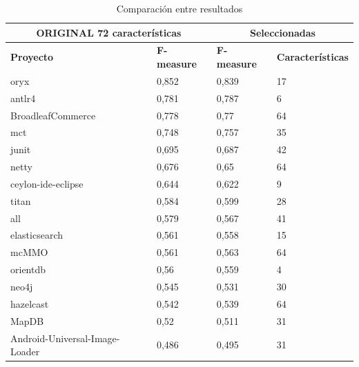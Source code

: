 \begin{table}[H]
\caption{\label{table:compare_original_selected_metric_count} Comparación entre resultados}
\begin{tabular}{llll}
\hline
\multicolumn{2}{c}{\textbf{ORIGINAL   72 características}} & \multicolumn{2}{c}{\textbf{Seleccionadas}}     \\
\hline
\textbf{Proyecto}                   & \textbf{F-measure}    & \textbf{F-measure} & \textbf{Características} \\
\hline
oryx                               & 0,852                 & 0,839              & 17                        \\
antlr4                             & 0,781                 & 0,787              & 6                         \\
BroadleafCommerce                  & 0,778                 & 0,77               & 64                        \\
mct                                & 0,748                 & 0,757              & 35                        \\
junit                              & 0,695                 & 0,687              & 42                        \\
netty                              & 0,676                 & 0,65               & 64                        \\
ceylon-ide-eclipse                 & 0,644                 & 0,622              & 9                         \\
titan                              & 0,584                 & 0,599              & 28                        \\
all                                & 0,579                 & 0,567              & 41                        \\
elasticsearch                      & 0,561                 & 0,558              & 15                        \\
mcMMO                              & 0,561                 & 0,563              & 64                        \\
orientdb                           & 0,56                  & 0,559              & 4                         \\
neo4j                              & 0,545                 & 0,531              & 30                        \\
hazelcast                          & 0,542                 & 0,539              & 64                        \\
MapDB                              & 0,52                  & 0,511              & 31                        \\
Android-Universal-Image-Loader     & 0,486                 & 0,495              & 31                       
\end{tabular}
\end{table}